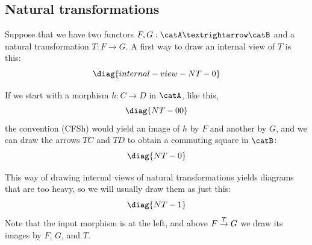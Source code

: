 \documentclass[oneside,12pt]{article}
\begin{document}
%                 
\subsection{Natural transformations \DONE}
\label{internal-view-NT}



Suppose that we have two functors $F,G:\catA → \catB$ and a natural
transformation $T:F→G$. A first way to draw an internal view of $T$ is
this:
%
$$\pu
  \diag{internal-view-NT-0}
$$

If we start with a morphism $h:C→D$ in $\catA$, like this,
%
%
$$\pu
  \diag{NT-00}
$$
%
the convention (CFSh) would yield an image of $h$ by $F$ and another
by $G$, and we can draw the arrows $TC$ and $TD$ to obtain a commuting
square in $\catB$:
%
%
$$\pu
  \diag{NT-0}
$$

This way of drawing internal views of natural transformations yields
diagrams that are too heavy, so we will usually draw them as just
this:
%
%
$$\pu
  \diag{NT-1}
$$
%
Note that the input morphism is at the left, and above $F \overset{T}{\to} G$
we draw its images by $F$, $G$, and $T$.
\end{document}
